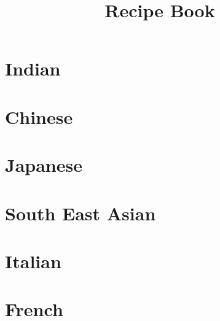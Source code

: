 \documentclass[a4paper,12pt]{book}
\title{Recipe Book}
\author{}
\date{}
\newcommand{\invisiblechapter}[1]{%
  \refstepcounter{chapter}%
  \addcontentsline{toc}{chapter}{\protect\numberline{\thechapter}#1}%
  \chaptermark{#1}}
\begin{document}
\maketitle
\tableofcontents
\chapter{Indian}








\chapter{Chinese}







\chapter{Japanese}



\chapter{South East Asian}







\chapter{Italian}







\chapter{French}


\end{document}
